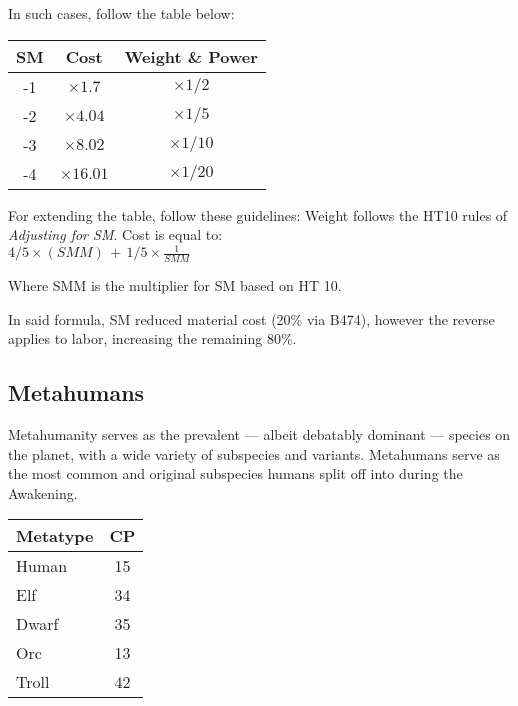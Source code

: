\begin{multicols*}{3}
	In such cases, follow the table below:
	
	\begin{center}
		\begin{tabular}{|c|c|c|}
			\hline
			SM & Cost & Weight \& Power \\
			\hline
			\hline
			-1 & $\times1.7$ & $\times1/2$ \\
			-2 & $\times4.04$ & $\times1/5$ \\
			-3 & $\times8.02$ & $\times1/10$ \\
			-4 & $\times16.01$ & $\times1/20$ \\
			\hline
		\end{tabular}
	\end{center}

	\begin{center}
		For extending the table, follow these guidelines: Weight follows the HT10 rules of \textit{Adjusting for SM}. Cost is equal to:\\ $4/5\times(SMM)\,+\,1/5\times\frac{1}{SMM}$
	\end{center}
	
	Where SMM is the multiplier for SM based on HT 10.
	
	In said formula, SM reduced material cost (20\% via B474), however the reverse applies to labor, increasing the remaining 80\%.
	
	\subsection{Metahumans}
	
	Metahumanity serves as the prevalent — albeit debatably dominant — species on the planet, with a wide variety of subspecies and variants. Metahumans serve as the most common and original subspecies humans split off into during the Awakening.
	
	\begin{center}
		\begin{tabularx}{0.32\textwidth}{|X|c|}
			\hline
			Metatype & CP \\
			\hline
			\hline
			Human & 15 \\
			Elf & 34 \\
			Dwarf & 35 \\
			Orc & 13 \\
			Troll & 42 \\
			\hline
		\end{tabularx}
	\end{center}
	

\end{multicols*}
